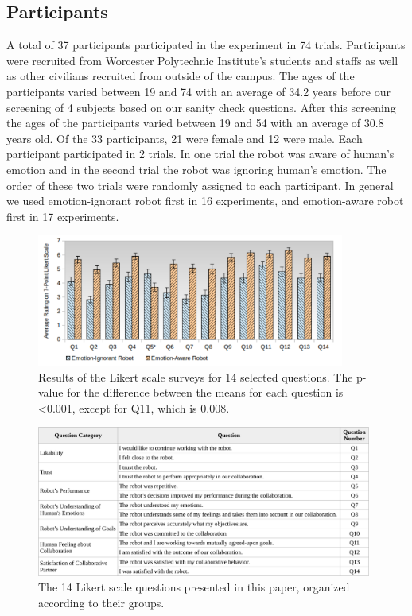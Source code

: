 \documentclass{sig-alternate-05-2015}
\begin{document}
\subsection{Participants}
\label{sec:Participants}
A total of 37 participants participated in the experiment in 74 trials.
Participants were recruited from Worcester Polytechnic Institute's students and
staffs as well as other civilians recruited from outside of the campus. The ages
of the participants varied between 19 and 74 with an average of 34.2 years
before our screening of 4 subjects based on our sanity check questions. After
this screening the ages of the participants varied between 19 and 54 with an
average of 30.8 years old. Of the 33 participants, 21 were female and 12
were male. Each participant participated in 2 trials. In one trial the robot was
aware of human's emotion and in the second trial the robot was ignoring human's
emotion. The order of these two trials were randomly assigned to each
participant. In general we used emotion-ignorant robot first in 16 experiments,
and emotion-aware robot first in 17 experiments.

\begin{figure}[tbh]
\centering
\includegraphics[width=0.9\textwidth]{figure/14Questions.pdf}
\caption{Results of the Likert scale surveys for 14 selected questions. The
p-value for the difference between the means for each question is <0.001,
except for Q11, which is 0.008.}
\label{fig:14Questions}
\vspace*{-5mm}
\end{figure}

\begin{figure}[tbh]
\centering
\includegraphics[width=0.98\textwidth]{figure/table1-croped.pdf}
\caption{The 14 Likert scale questions presented in this paper, organized
according to their groups.}
\label{fig:14Questions-Table}
\end{figure}
\end{document}

